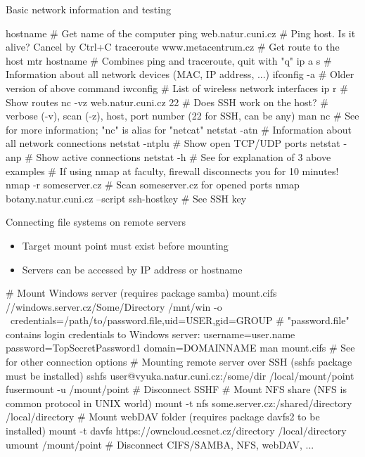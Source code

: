 \documentclass[compress, ucs, xelatex, 11pt, xcolor=svgnames,
  hyperref={
    bookmarks=true,
    unicode=true,
    colorlinks=true,
    pdftitle={Linux, command line and MetaCentrum},
    plainpages=false,
    pdfauthor={Vojtech Zeisek},
    pdfsubject={Course about use of Linux command line, writing shell scripts and using MetaCentrum of CESNET},
    pdfcreator={XeLaTeX},
    pdfkeywords={Linux, GNU, BASH, shell, command line, MetaCentrum},
    linkcolor=DarkRed,
    anchorcolor=DarkBlue,
    citecolor=Indigo,
    filecolor=NavyBlue,
    menucolor=DarkMagenta,
    urlcolor=DarkBlue,
    pdftex},
  url={hyphens, lowtilde} %
  ]{beamer}
\begin{document}
\begin{frame}[fragile]{Basic network information and testing}
  \begin{bashcode}
    hostname # Get name of the computer
    ping web.natur.cuni.cz # Ping host. Is it alive? Cancel by Ctrl+C
    traceroute www.metacentrum.cz # Get route to the host
    mtr hostname # Combines ping and traceroute, quit with "q"
    ip a s # Information about all network devices (MAC, IP address, ...)
    ifconfig -a # Older version of above command
    iwconfig # List of wireless network interfaces
    ip r # Show routes
    nc -vz web.natur.cuni.cz 22 # Does SSH work on the host?
      # verbose (-v), scan (-z), host, port number (22 for SSH, can be any)
    man nc # See for more information; "nc" is alias for "netcat"
    netstat -atn # Information about all network connections
    netstat -ntplu # Show open TCP/UDP ports
    netstat -anp # Show active connections
    netstat -h # See for explanation of 3 above examples
    # If using nmap at faculty, firewall disconnects you for 10 minutes!
    nmap -r someserver.cz # Scan someserver.cz for opened ports
    nmap botany.natur.cuni.cz --script ssh-hostkey # See SSH key
  \end{bashcode}
\end{frame}

\begin{frame}[fragile]{Connecting file systems on remote servers}
  \label{netfs}
  \begin{itemize}
    \item Target mount point must exist before mounting
    \item Servers can be accessed by IP address or hostname
  \end{itemize}
  \begin{bashcode}
    # Mount Windows server (requires package samba)
    mount.cifs //windows.server.cz/Some/Directory /mnt/win -o \
      credentials=/path/to/password.file,uid=USER,gid=GROUP
    # "password.file" contains login credentials to Windows server:
    username=user.name
    password=TopSecretPassword1
    domain=DOMAINNAME
    man mount.cifs # See for other connection options
    # Mounting remote server over SSH (sshfs package must be installed)
    sshfs user@vyuka.natur.cuni.cz:/some/dir /local/mount/point
    fusermount -u /mount/point # Disconnect SSHF
    # Mount NFS share (NFS is common protocol in UNIX world)
    mount -t nfs some.server.cz:/shared/directory /local/directory
    # Mount webDAV folder (requires package davfs2 to be installed)
    mount -t davfs https://owncloud.cesnet.cz/directory /local/directory
    umount /mount/point # Disconnect CIFS/SAMBA, NFS, webDAV, ...
  \end{bashcode}
\end{frame}
\end{document}

